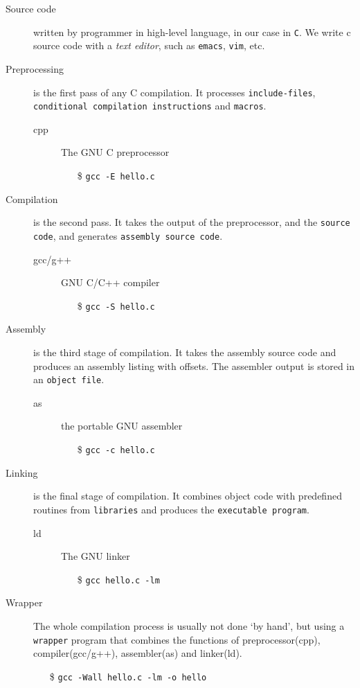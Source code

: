 \begin{description}
\item[Source code] written by programmer in high-level language, in our case in
  \texttt{C}. We write c source code with a \emph{text editor}, such as \texttt{emacs},
  \texttt{vim}, etc.
\item[Preprocessing] is the first pass of any C compilation. It processes
  \texttt{include-files}, \texttt{conditional compilation instructions} and
  \texttt{macros}.
  \begin{description}
  \item[cpp] The GNU C preprocessor
    \begin{itemize}
    \item[\$] \texttt{gcc -E hello.c}
    \end{itemize}
  \end{description}
\item[{Compilation}] is the second pass. It takes the output of the preprocessor, and the
  \texttt{source code}, and generates \texttt{assembly source code}.
  \begin{description}
  \item[gcc/g++] GNU C/C++ compiler
    \begin{itemize}
    \item[\$] \texttt{gcc -S hello.c}
    \end{itemize}
  \end{description}
\item[Assembly] is the third stage of compilation. It takes the assembly source code and
  produces an assembly listing with offsets. The assembler output is stored in an
  \texttt{object file}.
  \begin{description}
  \item[as] the portable GNU assembler
    \begin{itemize}
    \item[\$] \texttt{gcc -c hello.c}
    \end{itemize}
  \end{description}
\item[Linking] is the final stage of compilation. It combines object code with predefined
  routines from \texttt{libraries} and produces the \texttt{executable program}.
  \begin{description}
  \item[ld] The GNU linker
    \begin{itemize}
    \item[\$] \texttt{gcc hello.c -lm}
    \end{itemize}
  \end{description}
\item[{Wrapper}] The whole compilation process is usually not done `by hand', but using a
  \texttt{wrapper} program that combines the functions of preprocessor(cpp),
  compiler(gcc/g++), assembler(as) and linker(ld).
  \begin{itemize}
  \item[\$] \texttt{gcc -Wall hello.c -lm -o hello}
  \end{itemize}
\end{description}

